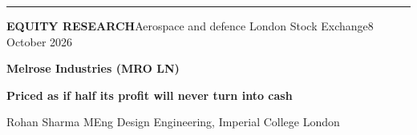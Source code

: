 \documentclass[10pt]{article}
\begin{document}
{\color{navy}\rule{\textwidth}{2.4pt}}\par\vspace{-0.3ex}
{\small\color{ink2}\textbf{EQUITY RESEARCH}\hfill Aerospace and defence \textbar{} London Stock Exchange\hfill 8 October 2026}\par
\vspace{-0.6ex}{\color{hair}\rule{\textwidth}{0.4pt}}\par
\vspace{0.3ex}
{\LARGE\bfseries Melrose Industries (MRO LN)}\par\vspace{0.4ex}
{\large\bfseries\color{accent}Priced as if half its profit will never turn into cash}\par\vspace{0.2ex}
{\small\color{ink2}Rohan Sharma \textbar{} MEng Design Engineering, Imperial College London}\par
\vspace{1.0ex}
\end{document}
